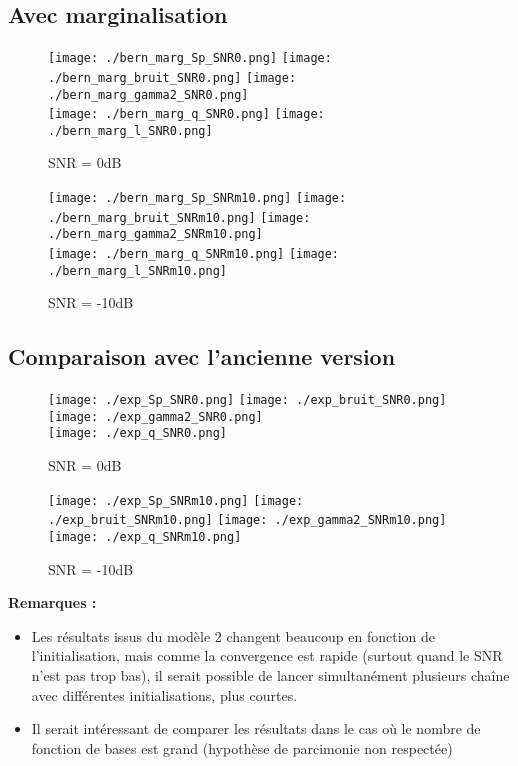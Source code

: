 \documentclass[ 12pt]{article}
\begin{document}
\subsection{Avec marginalisation}
\begin{figure}[H]
\centering
	\texttt{[image: ./bern\_marg\_Sp\_SNR0.png]}
	 \texttt{[image: ./bern\_marg\_bruit\_SNR0.png]}
	\texttt{[image: ./bern\_marg\_gamma2\_SNR0.png]}\\
	\texttt{[image: ./bern\_marg\_q\_SNR0.png]}
	\texttt{[image: ./bern\_marg\_l\_SNR0.png]}
	\caption{SNR = 0dB}
\end{figure}
\begin{figure}[H]
\centering
	\texttt{[image: ./bern\_marg\_Sp\_SNRm10.png]}
	 \texttt{[image: ./bern\_marg\_bruit\_SNRm10.png]}
	\texttt{[image: ./bern\_marg\_gamma2\_SNRm10.png]}\\
	\texttt{[image: ./bern\_marg\_q\_SNRm10.png]}
	\texttt{[image: ./bern\_marg\_l\_SNRm10.png]}
	\caption{SNR = -10dB}
\end{figure}

\newpage
\subsection{Comparaison avec l'ancienne version}
\begin{figure}[H]
\centering
	\texttt{[image: ./exp\_Sp\_SNR0.png]}
	 \texttt{[image: ./exp\_bruit\_SNR0.png]}
	\texttt{[image: ./exp\_gamma2\_SNR0.png]}\\
	\texttt{[image: ./exp\_q\_SNR0.png]}
	\caption{SNR = 0dB}
\end{figure}
\begin{figure}[H]
\centering
	\texttt{[image: ./exp\_Sp\_SNRm10.png]}
	 \texttt{[image: ./exp\_bruit\_SNRm10.png]}
	\texttt{[image: ./exp\_gamma2\_SNRm10.png]}\\
	\texttt{[image: ./exp\_q\_SNRm10.png]}
	\caption{SNR = -10dB}
\end{figure}
%


\textbf{Remarques : }
\begin{itemize}
        \item Les résultats issus du modèle 2 changent beaucoup en fonction de l'initialisation, mais comme la convergence est rapide (surtout quand le SNR n'est pas trop bas), il serait possible de lancer simultanément plusieurs chaîne avec différentes initialisations, plus courtes.
        \item Il serait intéressant de comparer les résultats dans le cas où le nombre de fonction de bases est grand (hypothèse de parcimonie non respectée)
\end{itemize}
\end{document}
